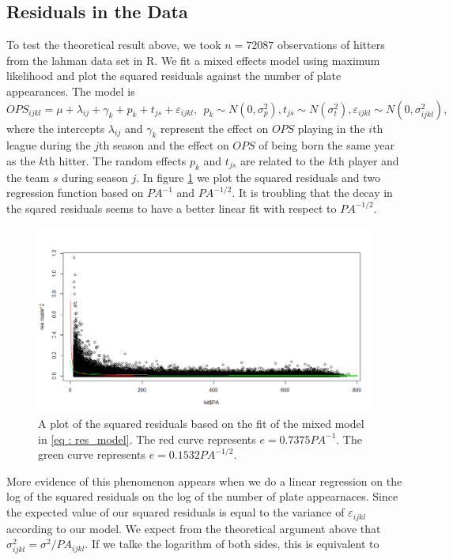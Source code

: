 \documentclass [52pt] {article}
\begin{document}
\subsection{Residuals in the Data}
To test the theoretical result above, we took $n = 72087$ observations of hitters from the lahman data set in R.  We fit a mixed effects model using maximum likelihood and plot the squared residuals against the number of plate appearances.  The model is
\begin{equation}\label{eq : res_model}
OPS_{ijkl} =\mu + \lambda_{ij} + \gamma_{k} + p_k + t_{js} + \varepsilon_{ijkl},\:\:p_k\sim N(0,\sigma_p^2), t_{js}\sim N(\sigma_t^2),\varepsilon_{ijkl}\sim N(0,\sigma^2_{ijkl}),
\end{equation}
where the intercepts $\lambda_{ij}$ and $\gamma_k$ represent the effect on $OPS$ playing in the $i$th league during the $j$th season and the effect on $OPS$ of being born the same year as the $k$th hitter.  The random effects $p_k$ and $t_{js}$ are related to the $k$th player and the team $s$ during season $j$.  In figure \ref{fig : sq_res_PA} we plot the squared residuals and two regression function based on $PA^{-1}$ and $PA^{-1/2}$.  It is troubling that the decay in the sqared residuals seems to have a better linear fit with respect to $PA^{-1/2}$.  
\begin{figure}[h!]
\centering
\includegraphics[scale = 0.5]{sq_res_vs_PA.png}
\caption{\label{fig : sq_res_PA} A plot of the squared residuals based on the fit of the mixed model in \ref{eq : res_model}.  The red curve represents $e = 0.7375 PA^{-1}$.  The green curve represents $e = 0.1532 PA^{-1/2}$.}
\end{figure}
More evidence of this phenomenon appears when we do a linear regression on the log of the squared residuals on the log of the number of plate appearnaces.  Since the expected value of our squared residuals is equal to the variance of $\varepsilon_{ijkl}$ according to our model.  We expect from the theoretical argument above that $\sigma^2_{ijkl} = \sigma^2/PA_{ijkl}$.  If we talke the logarithm of both sides, this is equivalent to 
\end{document}
